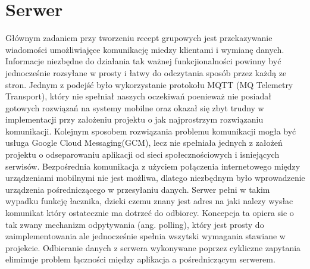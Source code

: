 \documentclass[11pt,a4paper,polish,thesis]{dcsbook}
\begin{document}

\section{Serwer}


Głównym zadaniem przy tworzeniu recept grupowych jest przekazywanie wiadomości umożliwiajęce komunikację miedzy klientami i wymianę danych. 
Informacje niezbędne do działania tak ważnej funkcjionalności powinny być jednocześnie rozsyłane w prosty i łatwy do odczytania sposób przez każdą ze stron.
Jednym z podejść było wykorzystanie protokołu MQTT (MQ Telemetry Transport), który nie spełniał naszych oczekiwań poenieważ nie posiadał gotowych rozwiązań na systemy mobilne oraz okazał się zbyt trudny w implementacji przy założeniu projektu o jak najprostrzym rozwiązaniu komunikacji.
Kolejnym sposobem rozwiązania problemu komunikacji mogła być usługa Google Cloud Messaging(GCM), lecz nie spełniała jednych z założeń projektu o odseparowaniu aplikacji od sieci społecznościowych i isniejących serwisów.
Bezpośrednia komunikacja z użyciem połączenia internetowego między urządzeniami mobilnymi nie jest możliwa, dlatego niezbędnym było wprowadzenie urządzenia pośredniczącego w przesyłaniu danych. 
Serwer pełni w takim wypadku funkcję łacznika, dzieki czemu znany jest adres na jaki nalezy wysłac komunikat który ostatecznie ma dotrzeć do odbiorcy. 
Koncepcja ta opiera sie o tak zwany mechanizm odpytywania (ang. polling), który jest prosty do zaimplementowania ale jednocześnie spełnia wszytski wymagania stawiane w projekcie.
Odbieranie danych z serwera wykonywane poprzez cykliczne zapytania eliminuje problem łączności między aplikacja a pośredniczącym serwerem.
\end{document}
